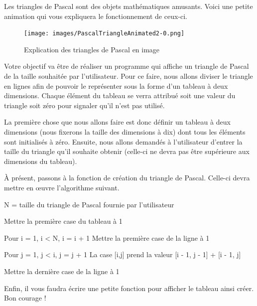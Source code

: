 Les triangles de Pascal sont des objets mathématiques amusants. Voici
une petite animation qui vous expliquera le fonctionnement de ceux-ci.

\begin{figure}[htbp]
\centering
\texttt{[image: images/PascalTriangleAnimated2-0.png]}
\caption{Explication des triangles de Pascal en image}
\end{figure}

Votre objectif va être de réaliser un programme qui affiche un triangle
de Pascal de la taille souhaitée par l'utilisateur. Pour ce faire, nous
allons diviser le triangle en lignes afin de pouvoir le représenter sous
la forme d'un tableau à deux dimensions. Chaque élément du tableau se
verra attribué soit une valeur du triangle soit zéro pour signaler qu'il
n'est pas utilisé.

La première chose que nous allons faire est donc définir un tableau à
deux dimensions (nous fixerons la taille des dimensions à dix) dont tous
les éléments sont initialisés à zéro. Ensuite, nous allons demandés à
l'utilisateur d'entrer la taille du triangle qu'il souhaite obtenir
(celle-ci ne devra pas être supérieure aux dimensions du tableau).

À présent, passons à la fonction de création du triangle de Pascal.
Celle-ci devra mettre en œuvre l'algorithme suivant.

\begin{C}
N = taille du triangle de Pascal fournie par l’utilisateur

Mettre la première case du tableau à 1

Pour i = 1, i < N, i = i + 1
    Mettre la première case de la ligne à 1

    Pour j = 1, j < i, j = j + 1
         La case [i,j] prend la valeur [i - 1, j - 1] + [i - 1, j]

    Mettre la dernière case de la ligne à 1
\end{C}

Enfin, il vous faudra écrire une petite fonction pour afficher le
tableau ainsi créer.
Bon courage !


